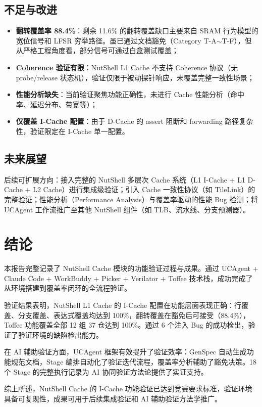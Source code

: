 \documentclass[12pt,a4paper]{ctexart}
\begin{document}
\subsection{不足与改进}

\begin{itemize}[leftmargin=*]
  \item \textbf{翻转覆盖率 88.4\%}：剩余 11.6\% 的翻转覆盖缺口主要来自 SRAM 行为模型的宽位信号和 LFSR 穷举路径。虽已通过文档豁免（Category T-A$\sim$T-F），但从严格工程角度看，部分信号可通过白盒测试覆盖；
  \item \textbf{Coherence 验证有限}：NutShell L1 Cache 不支持 Coherence 协议（无 probe/release 状态机），验证仅限于被动探针响应，未覆盖完整一致性场景；
  \item \textbf{性能分析缺失}：当前验证聚焦功能正确性，未进行 Cache 性能分析（命中率、延迟分布、带宽等）；
  \item \textbf{仅覆盖 I-Cache 配置}：由于 D-Cache 的 assert 阻断和 forwarding 路径复杂性，验证限定在 I-Cache 单一配置。
\end{itemize}

\subsection{未来展望}

后续可扩展方向：接入完整的 NutShell 多层次 Cache 系统（L1 I-Cache + L1 D-Cache + L2 Cache）进行集成级验证；引入 Cache 一致性协议（如 TileLink）的完整验证；性能分析（Performance Analysis）与覆盖率驱动的性能 Bug 检测；将 UCAgent 工作流推广至其他 NutShell 组件（如 TLB、流水线、分支预测器）。

\newpage

\section{结论}

本报告完整记录了 NutShell Cache 模块的功能验证过程与成果。通过 UCAgent + Claude Code + WorkBuddy + Picker + Verilator + Toffee 技术栈，成功完成了从环境搭建到覆盖率闭环的全流程验证。

验证结果表明，NutShell L1 Cache 的 I-Cache 配置在功能层面表现正确：行覆盖、分支覆盖、表达式覆盖均达到 100\%，翻转覆盖在豁免后可接受（88.4\%），Toffee 功能覆盖全部 12 组 37 仓达到 100\%。通过 6 个注入 Bug 的成功检出，验证了验证环境的缺陷检出能力。

在 AI 辅助验证方面，UCAgent 框架有效提升了验证效率：GenSpec 自动生成功能规范文档，Stage 编排自动化了验证迭代流程，覆盖率分析辅助了豁免决策。18 个 Stage 的完整执行记录为 AI 协同验证方法论提供了实证支持。

综上所述，NutShell Cache 的 I-Cache 功能验证已达到竞赛要求标准，验证环境具备可复现性，成果可用于后续集成验证和 AI 辅助验证方法学推广。
\end{document}
